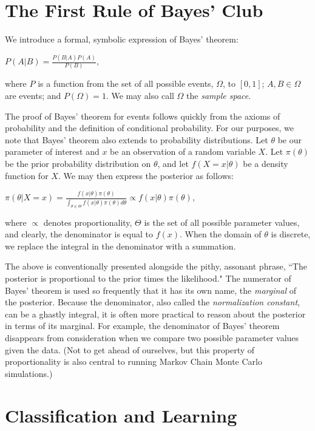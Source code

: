 \documentclass[12pt,twoside]{reedthesis}
\begin{document}
\section{The First Rule of Bayes' Club}

We introduce a formal, symbolic expression of Bayes' theorem: 

\begin{center}
	$P(A | B) = \displaystyle\frac{P(B | A)P(A)}{P(B)}$,
\end{center}
where $P$ is a function from the set of all possible events, $\Omega$, to $[0,1]$; $A, B \in \Omega$ are events; and $P(\Omega) = 1$. We may also call $\Omega$ the {\em sample space}.

	The proof of Bayes' theorem for events follows quickly from the axioms of probability and the definition of conditional probability. For our purposes, we note that Bayes' theorem also extends to probability distributions. Let $\theta$ be our parameter of interest and $x$ be an observation of a random variable $X$. Let $\pi(\theta)$ be the prior probability distribution on $\theta$, and let $f(X = x | \theta)$ be a density function for $X$. We may then express the posterior as follows:
\begin{center}
	$\pi(\theta | X = x) = \displaystyle\frac{f(x | \theta)\pi(\theta)}{\int_{\theta \in \Theta}f(x |\theta)\pi(\theta)d\theta} \propto f({x} | \theta)\pi(\theta)$,
\end{center}
where $\propto$ denotes proportionality, $\Theta$ is the set of all possible parameter values, and clearly, the denominator is equal to $f(x)$. When the domain of $\theta$ is discrete, we replace the integral in the denominator with a summation.

The above is conventionally presented alongside the pithy, assonant phrase, ``The posterior is proportional to the prior times the likelihood." The numerator of Bayes' theorem is used so frequently that it has its own name, the {\em marginal} of the posterior. Because the denominator, also called the {\em normalization constant}, can be a ghastly integral, it is often more practical to reason about the posterior in terms of its marginal. For example, the denominator of Bayes' theorem disappears from consideration when we compare two possible parameter values given the data. (Not to get ahead of ourselves, but this property of proportionality is also central to running Markov Chain Monte Carlo simulations.)

\section{Classification and Learning}
\end{document}
